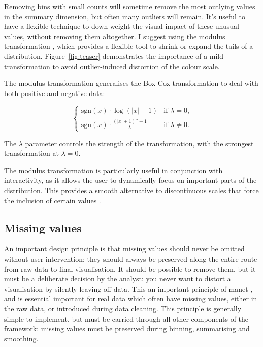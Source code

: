 \documentclass[journal]{vgtc}                %
\begin{document}
Removing bins with small counts will sometime remove the most outlying values in the summary dimension, but often many outliers will remain. It's useful to have a flexible technique to down-weight the visual impact of these unusual values, without removing them altogether. I suggest using the modulus transformation \citep{john:1980}, which provides a flexible tool to shrink or expand the tails of a distribution. Figure~\ref{fig:teaser} demonstrates the importance of a mild transformation to avoid outlier-induced distortion of the colour scale.

The modulus transformation generalises the Box-Cox transformation \citep{box:1964} to deal with both positive and negative data: 

\begin{equation}
\begin{cases} 
  \text{sgn}(x) \cdot \log(|x| + 1) & \text{if $\lambda = 0$,} \\
  \text{sgn}(x) \cdot \frac{(|x| + 1)^\lambda - 1}{\lambda} &\text{if $\lambda \ne 0$.}
\end{cases}
\end{equation}

The $\lambda$ parameter controls the strength of the transformation, with the strongest transformation at $\lambda = 0$. 

The modulus transformation is particularly useful in conjunction with interactivity, as it allows the user to dynamically focus on important parts of the distribution. This provides a smooth alternative to discontinuous scales that force the inclusion of certain values \citep{kandel:2012}.

\subsection{Missing values}
\label{sub:missing}

An important design principle is that missing values should never be omitted without user intervention: they should always be preserved along the entire route from raw data to final visualisation. It should be possible to remove them, but it must be a deliberate decision by the analyst: you never want to distort a visualisation by silently leaving off data. This an important principle of {\sc manet} \citep{unwin:1996}, and is essential important for real data which often have missing values, either in the raw data, or introduced during data cleaning. This principle is generally simple to implement, but must be carried through all other components of the framework: missing values must be preserved during binning, summarising and smoothing.
\end{document}
